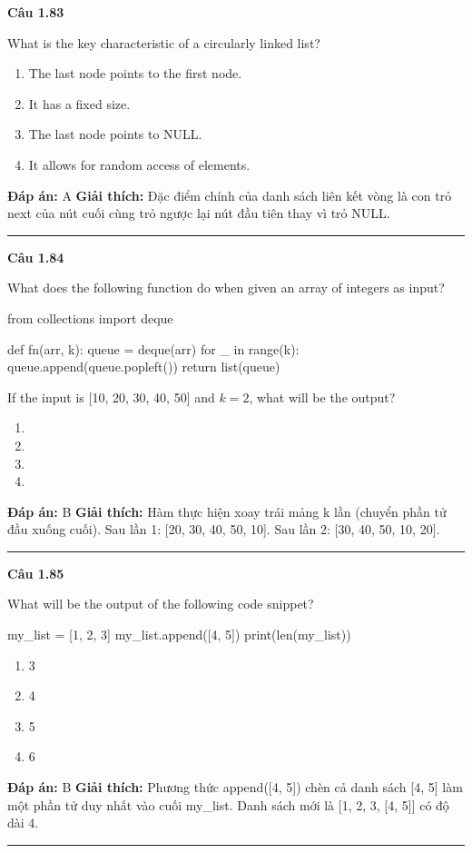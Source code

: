 \documentclass[11pt,a4paper]{article}
\newenvironment{question}[1]{%
  \par\vspace{1em}\noindent\textbf{\large Câu #1}\par\vspace{0.4em}
}{%
  \par\vspace{1em}\hrule\vspace{0.6em}
}
\newenvironment{choices}{%
  \begin{enumerate}[label=\textbf{\Alph*.},leftmargin=2.2em,itemsep=2pt,topsep=3pt]
}{%
  \end{enumerate}
}
\newcommand{\choice}{\item}
\newenvironment{codebox}{%
  \begin{tcolorbox}[colback=gray!8!white,colframe=gray!50!black,arc=1.5mm,boxrule=0.6pt,left=3mm,right=3mm,top=2.5mm,bottom=2.5mm]
  \ttfamily\small
}{%
  \end{tcolorbox}
}
\begin{document}
\begin{question}{1.83}
What is the key characteristic of a circularly linked list?
\begin{choices}
\choice The last node points to the first node.
\choice It has a fixed size.
\choice The last node points to NULL.
\choice It allows for random access of elements.
\end{choices}
\textbf{Đáp án:} A
\textbf{Giải thích:} Đặc điểm chính của danh sách liên kết vòng là con trỏ next của nút cuối cùng trỏ ngược lại nút đầu tiên thay vì trỏ NULL.
\end{question}

\begin{question}{1.84}
What does the following function do when given an array of integers as input?
\begin{codebox}
from collections import deque

def fn(arr, k):
    queue = deque(arr)
    for _ in range(k):
        queue.append(queue.popleft())
    return list(queue)
\end{codebox}
If the input is [10, 20, 30, 40, 50] and $k = 2$, what will be the output?
\begin{choices}
\choice [40, 50, 10, 20, 30]
\choice [30, 40, 50, 10, 20]
\choice [20, 30, 40, 50, 10]
\choice [50, 10, 20, 30, 40]
\end{choices}
\textbf{Đáp án:} B
\textbf{Giải thích:} Hàm thực hiện xoay trái mảng k lần (chuyển phần tử đầu xuống cuối). Sau lần 1: [20, 30, 40, 50, 10]. Sau lần 2: [30, 40, 50, 10, 20].
\end{question}

\begin{question}{1.85}
What will be the output of the following code snippet?
\begin{codebox}
my_list = [1, 2, 3]
my_list.append([4, 5])
print(len(my_list))
\end{codebox}
\begin{choices}
\choice 3
\choice 4
\choice 5
\choice 6
\end{choices}
\textbf{Đáp án:} B
\textbf{Giải thích:} Phương thức append([4, 5]) chèn cả danh sách [4, 5] làm một phần tử duy nhất vào cuối my_list. Danh sách mới là [1, 2, 3, [4, 5]] có độ dài 4.
\end{question}
\end{document}
